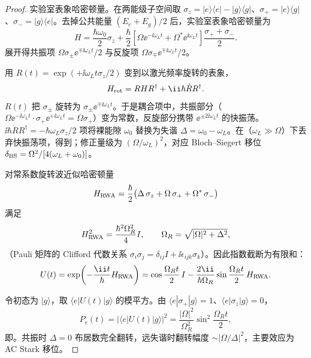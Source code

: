 \begin{proof}
实验室表象哈密顿量。在两能级子空间取 $\sigma_z=|e\rangle\langle e|-|g\rangle\langle g|$、$\sigma_+=|e\rangle\langle g|$、$\sigma_-=|g\rangle\langle e|$。去掉公共能量 $(E_e+E_g)/2$ 后，实验室表象哈密顿量为
\begin{equation*}
 H=\frac{\hbar\omega_0}{2}\sigma_z
 +\frac{\hbar}{2}
 \left[\Omega\ee^{-\ii\omega_L t}+\Omega^*\ee^{\ii\omega_L t}\right]
 \frac{\sigma_++\sigma_-}{2}.
\end{equation*}
展开得共振项 $\Omega\sigma_\pm\ee^{\mp\ii\omega_Lt}/2$ 与反旋项 $\Omega\sigma_\mp\ee^{\mp\ii\omega_Lt}/2$。

用 $R(t)=\exp(+\ii\omega_Lt\sigma_z/2)$ 变到以激光频率旋转的表象，
\begin{equation*}
 H_{\rm rot}=RHR^\dagger+\ii\hbar\dot R R^\dagger.
\end{equation*}
$R(t)$ 把 $\sigma_\pm$ 旋转为 $\sigma_\pm\ee^{\mp\ii\omega_Lt}$。于是耦合项中，共振部分（$\Omega\ee^{-\ii\omega_Lt}\cdot\sigma_+\ee^{+\ii\omega_Lt}=\Omega\sigma_+$）变为常数，反旋部分携带 $\ee^{\pm2\ii\omega_Lt}$ 的快振荡。$\ii\hbar\dot RR^\dagger=-\hbar\omega_L\sigma_z/2$ 项将裸能隙 $\omega_0$ 替换为失谐 $\Delta=\omega_0-\omega_L$。在（$\omega_L\gg\Omega$）下丢弃快振荡项，得到；修正量级为 $(\Omega/\omega_L)^2$，对应 Bloch--Siegert 移位 $\delta_{\rm BS}=\Omega^2/[4(\omega_L+\omega_0)]$。

对常系数旋转波近似哈密顿量
\begin{equation*}
 H_{\rm RWA}=\frac{\hbar}{2}\bigl(\Delta\,\sigma_z+\Omega\,\sigma_++\Omega^*\,\sigma_-\bigr)
\end{equation*}
满足
\begin{equation*}
 H_{\rm RWA}^2=\frac{\hbar^2\Omega_R^2}{4}I,
 \qquad
 \Omega_R=\sqrt{|\Omega|^2+\Delta^2},
\end{equation*}
（Pauli 矩阵的 Clifford 代数关系 $\sigma_i\sigma_j=\delta_{ij}I+\ii\epsilon_{ijk}\sigma_k$）。因此指数截断为有限和：
\begin{equation*}
 U(t)=\exp\!\left(-\frac{\ii t}{\hbar}H_{\rm RWA}\right)
 =\cos\frac{\Omega_Rt}{2}\,I
 -\frac{2\ii}{\hbar\Omega_R}
 \sin\frac{\Omega_Rt}{2}\,H_{\rm RWA}.
\end{equation*}

令初态为 $|g\rangle$，取 $\langle e|U(t)|g\rangle$ 的模平方。由 $\langle e|\sigma_+|g\rangle=1$、$\langle e|\sigma_z|g\rangle=0$，
\begin{equation*}
 P_e(t)=|\langle e|U(t)|g\rangle|^2
 =\frac{|\Omega|^2}{\Omega_R^2}\sin^2\frac{\Omega_R t}{2},
\end{equation*}
即。共振时 $\Delta=0$ 布居数完全翻转，远失谐时翻转幅度 $\sim|\Omega/\Delta|^2$，主要效应为 AC Stark 移位。
\end{proof}

